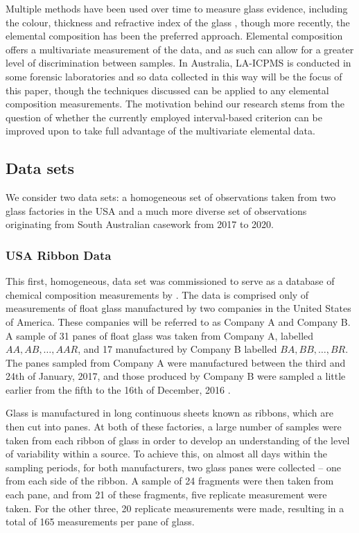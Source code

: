 \documentclass[a4paper]{article}
\begin{document}
Multiple methods have been used over time to measure glass evidence, including the colour, thickness and refractive index of the glass \citep{Curran2000}, though more recently, the elemental composition has been the preferred approach. Elemental composition offers a multivariate measurement of the data, and as such can allow for a greater level of discrimination between samples. In Australia, LA-ICPMS \citep{Houk1990,Curran1997,Aeschliman2003,Weis2011,Trejos2013,Dorn2015} is conducted in some forensic laboratories and so data collected in this way will be the focus of this paper, though the techniques discussed can be applied to any elemental composition measurements. The motivation behind our research stems from the question of whether the currently employed interval-based criterion can be improved upon to take full advantage of the multivariate elemental data.

\subsection{Data sets}

We consider two data sets: a homogeneous set of observations taken from two glass factories in the USA and a much more diverse set of observations originating from South Australian casework from 2017 to 2020.

\subsubsection*{USA Ribbon Data}

This first, homogeneous, data set was commissioned to serve as a database of chemical composition measurements by \citet{Park2019}. The data is comprised only of measurements of float glass manufactured by two companies in the United States of America. These companies will be referred to as Company A and Company B. A sample of 31 panes of float glass was taken from Company A, labelled $AA, AB, \dots, AAR$, and 17 manufactured by Company B labelled $BA, BB, \dots, BR$. The panes sampled from Company A were manufactured between the third and 24th of January, 2017, and those produced by Company B were sampled a little earlier from the fifth to the 16th of December, 2016 \citep{Park2020}. 

Glass is manufactured in long continuous sheets known as ribbons, which are then cut into panes. At both of these factories, a large number of samples were taken from each ribbon of glass in order to develop an understanding of the level of variability within a source. To achieve this, on almost all days within the sampling periods, for both manufacturers, two glass panes were collected -- one from each side of the ribbon. A sample of 24 fragments were then taken from each pane, and from 21 of these fragments, five replicate measurement were taken. For the other three, 20 replicate measurements were made, resulting in a total of 165 measurements per pane of glass.
\end{document}

